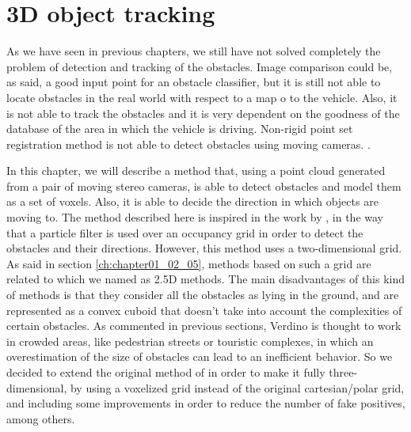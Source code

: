 
\graphicspath{{./images/chapter05/bmps/}{./images/chapter05/vects/}{./images/chapter05/}}

\chapter{3D object tracking}\label{ch:chapter05}

As we have seen in previous chapters, we still have not solved completely the problem of detection and tracking of the obstacles. Image comparison could be, as said, a good input point for an obstacle classifier, but it is still not able to locate obstacles in the real world with respect to a map o to the vehicle. Also, it is not able to track the obstacles and it is very dependent on the goodness of the database of the area in which the vehicle is driving. Non-rigid point set registration method is not able to detect obstacles using moving cameras. . 

In this chapter, we will describe a method that, using a point cloud generated from a pair of moving stereo cameras, is able to detect obstacles and model them as a set of voxels. Also, it is able to decide the direction in which objects are moving to. The method described here is inspired in the work by \cite{danescu2012particle}, in the way that a particle filter is used over an occupancy grid in order to detect the obstacles and their directions. However, this method uses a two-dimensional grid. As said in section \ref{ch:chapter01_02_05}, methods based on such a grid are related to which we named as 2.5D methods. The main disadvantages of this kind of methods is that they consider all the obstacles as lying in the ground, and are represented as a convex cuboid that doesn't take into account the complexities of certain obstacles.
As commented in previous sections, Verdino is thought to work in crowded areas, like pedestrian streets or touristic complexes, in which an overestimation of the size of obstacles can lead to an inefficient behavior. So we decided to extend the original method of \cite{danescu2012particle} in order to make it fully three-dimensional, by using a voxelized grid instead of the original cartesian/polar grid, and including some improvements in order to reduce the number of fake positives, among others.


